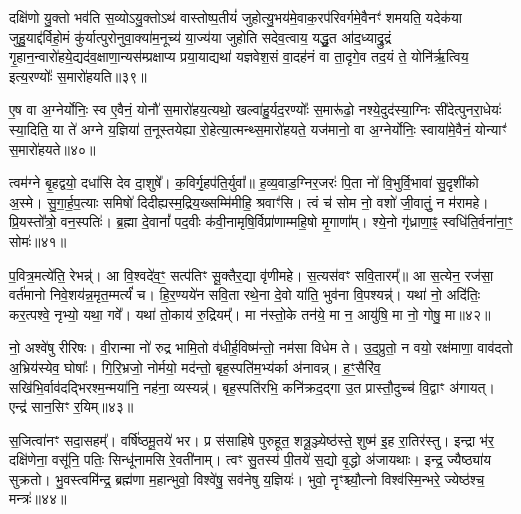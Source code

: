 दक्षि॑णो यु॒क्तो भव॑ति स॒व्यो\-ऽयु॒क्तो\-ऽथ॑ वास्तोष्प॒तीयं॑ जुहोत्यु॒भय॑मे॒वाक॒रप॑रिवर्गमे॒वैनꣳ॑ शमयति॒ यदेक॑या जुहु॒याद्द॑र्विहो॒मं कु॑र्यात्पुरोनुवा॒क्या॑म॒नूच्य॑ या॒ज्य॑या जुहोति सदेव॒त्वाय॒ यद्धु॒त आ॑द॒ध्याद्रु॒द्रं गृ॒हान॒न्वारो॑हये॒द्यद॑व॒\-क्षाणा॒न्यस॑म्प्रक्षाप्य प्रया॒याद्यथा॑ यज्ञवेश॒सं वा॒दह॑नं वा ता॒दृगे॒व तद॒यं ते॒ योनि॑र्\mbox{}ऋ॒त्विय॒ इत्य॒रण्योः᳚ स॒मारो॑हयति॥३९॥

ए॒ष वा अ॒ग्नेर्योनिः॒ स्व ए॒वैनं॒ योनौ॑ स॒मारो॑हय॒त्यथो॒ खल्वा॑हु॒र्यद॒रण्योः᳚ स॒मारू॑ढो॒ नश्ये॒दुद॑स्या॒ग्निः सी॑देत्पुनरा॒धेयः॑ स्या॒दिति॒ या ते॑ अग्ने य॒ज्ञिया॑ त॒नूस्तयेह्या रो॒हेत्या॒त्मन्थ्स॒मारो॑हयते॒ यज॑मानो॒ वा अ॒ग्नेर्योनिः॒ स्वाया॑मे॒वैनं॒ योन्याꣳ॑ स॒मारो॑हयते॥४०॥

{}

त्वम॑ग्ने बृ॒हद्वयो॒ दधा॑सि देव दा॒शुषे᳚। क॒विर्गृ॒हप॑ति॒र्युवा᳚॥ ह॒व्य॒वाड॒ग्निर॒जरः॑ पि॒ता नो॑ वि॒भुर्वि॒भावा॑ सु॒दृशी॑को अ॒स्मे। सु॒गा॒र्\mbox{}ह॒प॒त्याः समिषो॑ दिदीह्यस्म॒द्रिय॒ख्सम्मि॑मीहि॒ श्रवाꣳ॑सि। त्वं च॑ सोम नो॒ वशो॑ जी॒वातुं॒ न म॑रामहे। प्रि॒यस्तो᳚त्रो॒ वन॒स्पतिः॑। ब्र॒ह्मा दे॒वानां᳚ पद॒वीः क॑वी॒नामृषि॒र्विप्रा॑णाम्महि॒षो मृ॒गाणा᳚म्। श्ये॒नो गृ॑ध्राणा॒ꣴ॒ स्वधि॑ति॒र्वना॑ना॒ꣳ॒ सोमः॑॥४१॥

प॒वित्र॒मत्ये॑ति॒ रेभन्न्॑। आ वि॒श्वदे॑व॒ꣳ॒ सत्प॑तिꣳ सू॒क्तैर॒द्या वृ॑णीमहे। स॒त्यस॑वꣳ सवि॒तारम्᳚॥ आ स॒त्येन॒ रज॑सा॒ वर्त॑मानो निवे॒शय॑न्न॒मृत॒म्मर्त्यं॑ च। हि॒र॒ण्यये॑न सवि॒ता रथे॒ना दे॒वो या॑ति॒ भुव॑ना वि॒पश्यन्न्॑। यथा॑ नो॒ अदि॑तिः॒ कर॒त्पश्वे॒ नृभ्यो॒ यथा॒ गवे᳚। यथा॑ तो॒काय॑ रु॒द्रियम्᳚। मा न॑स्तो॒के तन॑ये॒ मा न॒ आयु॑षि॒ मा नो॒ गोषु॒ मा॥४२॥

नो॒ अश्वे॑षु रीरिषः। वी॒रान्मा नो॑ रुद्र भामि॒तो व॑धीर्\mbox{}ह॒विष्म॑न्तो॒ नम॑सा विधेम ते। उ॒द॒प्रुतो॒ न वयो॒ रक्ष॑माणा॒ वाव॑दतो अ॒भ्रिय॑स्येव॒ घोषाः᳚। गि॒रि॒भ्रजो॒ नोर्मयो॒ मद॑न्तो॒ बृह॒स्पति॑म॒भ्य॑र्का अ॑नावन्न्। ह॒ꣳ॒सैरि॑व॒ सखि॑भि॒र्वाव॑दद्भिरश्म॒न्मया॑नि॒ नह॑ना॒ व्यस्यन्न्॑। बृह॒स्पति॑रभि॒ कनि॑क्रद॒द्गा उ॒त प्रास्तौ॒दुच्च॑ वि॒द्वाꣳ अ॑गायत्। एन्द्र॑ सान॒सिꣳ र॒यिम्॥४३॥

स॒जित्वा॑नꣳ सदा॒सहम्᳚। वर्\mbox{}षि॑ष्ठमू॒तये॑ भर। प्र स॑साहिषे पुरुहूत॒ शत्रू॒ञ्ज्येष्ठ॑स्ते॒ शुष्म॑ इ॒ह रा॒तिर॑स्तु। इन्द्रा भ॑र॒ दक्षि॑णेना॒ वसू॑नि॒ पतिः॒ सिन्धू॑नामसि रे॒वती॑नाम्। त्वꣳ सु॒तस्य॑ पी॒तये॑ स॒द्यो वृ॒द्धो अ॑जायथाः। इन्द्र॒ ज्यैष्ठ्या॑य सुक्रतो। भु॒वस्त्वमि॑न्द्र॒ ब्रह्म॑णा म॒हान्भुवो॒ विश्वे॑षु॒ सव॑नेषु य॒ज्ञियः॑। भुवो॒ नॄꣳश्च्यौ॒त्नो विश्व॑स्मि॒न्भरे॒ ज्येष्ठ॑श्च॒ मन्त्रः॑॥४४॥

